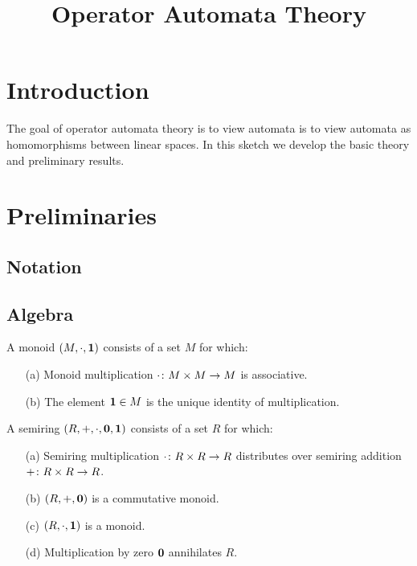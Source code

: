 \documentclass[12pt]{article}
\title{Operator Automata Theory}
\date{}
\begin{document}
\maketitle

\section{Introduction}

The goal of operator automata theory is to view automata is to
view automata as homomorphisms between linear spaces.
In this sketch we develop the basic theory and preliminary results.


\section{Preliminaries}

\subsection{Notation}


\subsection{Algebra}

\begin{definition}[Monoid]
  A monoid \(\left(M, \cdot, \mathbf{1}\right)\) consists of a set \(M\) for which:
  \begin{enumerate}
    \item[(a)]
      Monoid multiplication
      \(\cdot \colon M \times M \to M\) is associative.

    \item[(b)]
      The element \(\mathbf{1} \in M\) is the unique identity of multiplication.
  \end{enumerate}
\end{definition}

\begin{definition}[Semiring]
  A semiring \(\left(R, +, \cdot, \mathbf{0}, \mathbf{1}\right)\) consists of a set \(R\)
  for which:
  \begin{enumerate}
    \item[(a)]
      Semiring multiplication \(\cdot \colon R \times R \to R\)
      distributes over semiring addition \(+ \colon R \times R \to R\).

    \item[(b)]
      \(\left(R, +, \mathbf{0}\right)\) is a commutative monoid.

    \item[(c)]
      \(\left(R, \cdot, \mathbf{1}\right)\) is a monoid.

    \item[(d)]
      Multiplication by zero \(\mathbf{0}\) annihilates \(R\).
  \end{enumerate}
\end{definition}
\end{document}
